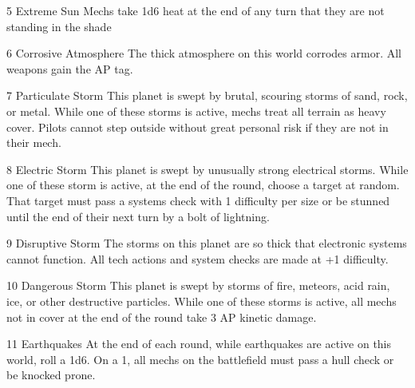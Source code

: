 5       Extreme Sun                         Mechs take 1d6 heat at the end of any turn that they  
                                            are not standing in the shade 

6       Corrosive Atmosphere               The thick atmosphere on this world corrodes armor. All  
                                            weapons gain the AP tag. 

7       Particulate Storm                  This planet is swept by brutal, scouring storms of sand,  
                                            rock, or metal. While one of these storms is active,  
                                            mechs treat all terrain as heavy cover. Pilots cannot  
                                            step outside without great personal risk if they are not  
                                            in their mech. 

8       Electric Storm                     This planet is swept by unusually strong electrical  
                                            storms. While one of these storm is active, at the end of  
                                           the round, choose a target at random. That target must  
                                            pass a systems check with 1 difficulty per size or be  
                                            stunned until the end of their next turn by a bolt of  
                                            lightning. 

9       Disruptive Storm                   The storms on this planet are so thick that electronic  
                                            systems cannot function. All tech actions and system  
                                            checks are made at +1 difficulty. 

10      Dangerous Storm                    This planet is swept by storms of fire, meteors, acid  
                                            rain, ice, or other destructive particles. While one of  
                                           these storms is active, all mechs not in cover at the end  
                                            of the round take 3 AP kinetic damage. 

11      Earthquakes                        At the end of each round, while earthquakes are active  
                                            on this world, roll a 1d6. On a 1, all mechs on the  
                                            battlefield must pass a hull check or be knocked prone. 

